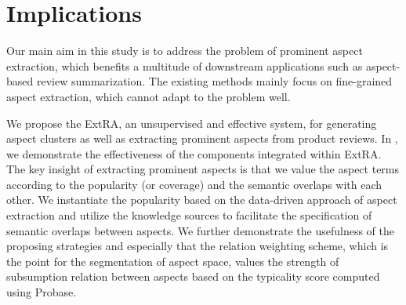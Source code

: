 \section{Implications}


\label{sec:implication}
Our main aim in this study is to address the problem of prominent aspect extraction, which benefits a multitude of downstream applications
such as aspect-based review summarization.
The existing methods mainly focus on 
fine-grained aspect extraction, which cannot adapt to 
the problem well.

We propose the ExtRA, an unsupervised
and effective system, for generating aspect clusters
as well as extracting prominent aspects from product reviews.
In , 
we demonstrate the effectiveness of 
the components integrated within ExtRA.
The key insight of extracting prominent aspects
is that we value the aspect terms according to
the popularity (or coverage) and the semantic overlaps with each other.
We instantiate the popularity based on the data-driven approach of 
aspect extraction
and utilize the knowledge sources to facilitate 
the specification of semantic overlaps between aspects.
We further demonstrate the usefulness of the proposing strategies
and especially that the relation weighting scheme, which is the point for
the segmentation of aspect space, values the strength of 
subsumption relation between aspects based on the 
typicality score computed using Probase.






